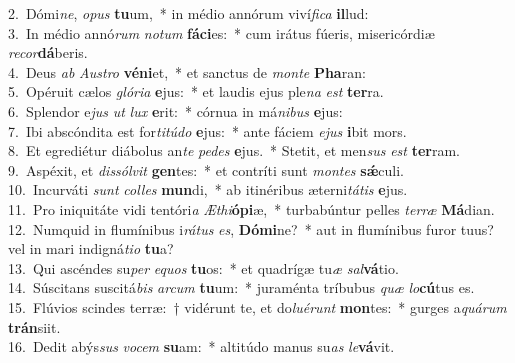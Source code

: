 {2.~}Dómi\textit{ne}, \textit{o}\textit{pus} \textbf{tu}um,~* in médio annórum viví\textit{fi}\textit{ca} \textbf{il}lud:\\
{3.~}In médio annó\textit{rum} \textit{no}\textit{tum} \textbf{fá}\textbf{ci}es:~* cum irátus fúeris, misericórdiæ \textit{re}\textit{cor}\textbf{dá}beris.\\
{4.~}Deus \textit{ab} \textit{Au}\textit{stro} \textbf{vé}\textbf{ni}et,~* et sanctus de \textit{mon}\textit{te} \textbf{Pha}ran:\\
{5.~}Opéruit cælos \textit{gló}\textit{ri}\textit{a} \textbf{e}jus:~* et laudis ejus ple\textit{na} \textit{est} \textbf{ter}ra.\\
{6.~}Splendor e\textit{jus} \textit{ut} \textit{lux} \textbf{e}rit:~* córnua in má\textit{ni}\textit{bus} \textbf{e}jus:\\
{7.~}Ibi abscóndita est for\textit{ti}\textit{tú}\textit{do} \textbf{e}jus:~* ante fáciem \textit{e}\textit{jus} \textbf{i}bit mors.\\
{8.~}Et egrediétur diábolus an\textit{te} \textit{pe}\textit{des} \textbf{e}jus.~* Stetit, et men\textit{sus} \textit{est} \textbf{ter}ram.\\
{9.~}Aspéxit, et \textit{dis}\textit{sól}\textit{vit} \textbf{gen}tes:~* et contríti sunt \textit{mon}\textit{tes} \textbf{sǽ}culi.\\
{10.~}Incurváti \textit{sunt} \textit{col}\textit{les} \textbf{mun}di,~* ab itinéribus æterni\textit{tá}\textit{tis} \textbf{e}jus.\\
{11.~}Pro iniquitáte vidi tentóri\textit{a} \textit{Æ}\textit{thi}\textbf{ó}\textbf{pi}æ,~* turbabúntur pelles \textit{ter}\textit{ræ} \textbf{Má}dian.\\
{12.~}Numquid in flumínibus i\textit{rá}\textit{tus} \textit{es}, \textbf{Dó}\textbf{mi}ne?~* aut in flumínibus furor tuus? vel in mari indigná\textit{ti}\textit{o} \textbf{tu}a?\\
{13.~}Qui ascéndes su\textit{per} \textit{e}\textit{quos} \textbf{tu}os:~* et quadrígæ tu\textit{æ} \textit{sal}\textbf{vá}tio.\\
{14.~}Súscitans suscitá\textit{bis} \textit{ar}\textit{cum} \textbf{tu}um:~* juraménta tríbubus \textit{quæ} \textit{lo}\textbf{cú}tus es.\\
{15.~}Flúvios scindes terræ:~† vidérunt te, et do\textit{lu}\textit{é}\textit{runt} \textbf{mon}tes:~* gurges a\textit{quá}\textit{rum} \textbf{trán}siit.\\
{16.~}Dedit abýs\textit{sus} \textit{vo}\textit{cem} \textbf{su}am:~* altitúdo manus su\textit{as} \textit{le}\textbf{vá}vit.\\
